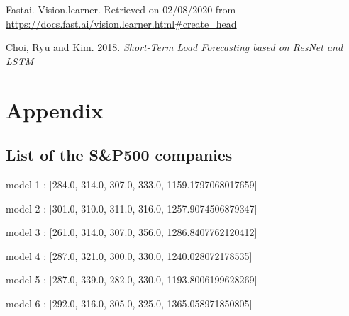\documentclass[11pt]{article}
\begin{document}
\begin{onehalfspace}
\begin{thebibliography}{9}
    Fastai. Vision.learner. Retrieved on 02/08/2020 from \url{https://docs.fast.ai/vision.learner.html#create_head}

    Choi, Ryu and Kim. 2018. \textit{Short-Term Load Forecasting based on
    ResNet and LSTM}

\end{thebibliography}

\pagebreak

\section{Appendix}

\subsection{List of the S\&P500 companies}
\label{505}

model 1 : [284.0, 314.0, 307.0, 333.0, 1159.1797068017659]

model 2 : [301.0, 310.0, 311.0, 316.0, 1257.9074506879347]

model 3 : [261.0, 314.0, 307.0, 356.0, 1286.8407762120412]

model 4 : [287.0, 321.0, 300.0, 330.0, 1240.028072178535]

model 5 : [287.0, 339.0, 282.0, 330.0, 1193.8006199628269]

model 6 : [292.0, 316.0, 305.0, 325.0, 1365.058971850805]


\end{onehalfspace}
\end{document}
